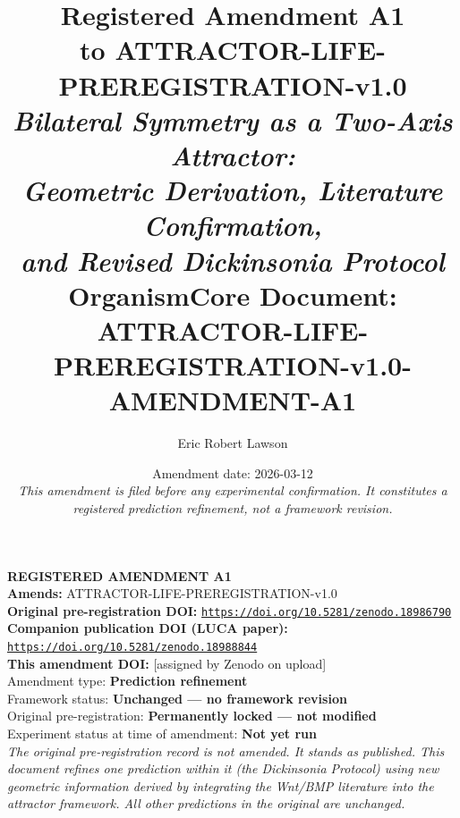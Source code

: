 \documentclass[12pt, a4paper]{article}
\title{
    \vspace{-1em}
    \textbf{Registered Amendment A1}\\[0.5em]
    \large\textbf{to ATTRACTOR-LIFE-PREREGISTRATION-v1.0}\\[0.6em]
    \normalsize\textit{Bilateral Symmetry as a Two-Axis Attractor:}\\
    \normalsize\textit{Geometric Derivation, Literature Confirmation,}\\
    \normalsize\textit{and Revised Dickinsonia Protocol}\\[0.6em]
    \small OrganismCore Document:
    ATTRACTOR-LIFE-PREREGISTRATION-v1.0-AMENDMENT-A1
}
\author[1]{Eric Robert Lawson}
\affil[1]{
    OrganismCore\\
    \href{mailto:OrganismCore@proton.me}
         {OrganismCore@proton.me}\\
    ORCID:
    \href{https://orcid.org/0009-0002-0414-6544}
         {0009-0002-0414-6544}\\
    Repository:
    \href{https://github.com/Eric-Robert-Lawson/attractor-oncology}
         {github.com/Eric-Robert-Lawson/attractor-oncology}
}
\date{
    Amendment date: 2026-03-12\\
    \small\textit{This amendment is filed before any
    experimental confirmation. It constitutes a registered
    prediction refinement, not a framework revision.}
}
\theoremstyle{definition}
\theoremstyle{remark}
\begin{document}

\maketitle
\thispagestyle{fancy}

\begin{center}
\colorbox{amendbox}{
\begin{minipage}{0.88\textwidth}
\vspace{0.6em}
\centering
\textbf{REGISTERED AMENDMENT A1}\\[0.4em]
\textbf{Amends:}
ATTRACTOR-LIFE-PREREGISTRATION-v1.0\\
\textbf{Original pre-registration DOI:}
\href{https://doi.org/10.5281/zenodo.18986790}
     {\texttt{https://doi.org/10.5281/zenodo.18986790}}\\[0.3em]
\textbf{Companion publication DOI (LUCA paper):}
\href{https://doi.org/10.5281/zenodo.18988844}
     {\texttt{https://doi.org/10.5281/zenodo.18988844}}\\[0.3em]
\textbf{This amendment DOI:} [assigned by Zenodo on upload]\\[0.3em]
\small
Amendment type: \textbf{Prediction refinement}\\
Framework status: \textbf{Unchanged --- no framework revision}\\
Original pre-registration: \textbf{Permanently locked ---
not modified}\\
Experiment status at time of amendment:
\textbf{Not yet run}\\[0.3em]
\textit{The original pre-registration record is not amended.
It stands as published. This document refines one prediction
within it (the Dickinsonia Protocol) using new geometric
information derived by integrating the Wnt/BMP literature
into the attractor framework. All other predictions in
the original are unchanged.}
\vspace{0.5em}
\end{minipage}
}
\end{center}

\vspace{0.8em}
\end{document}
